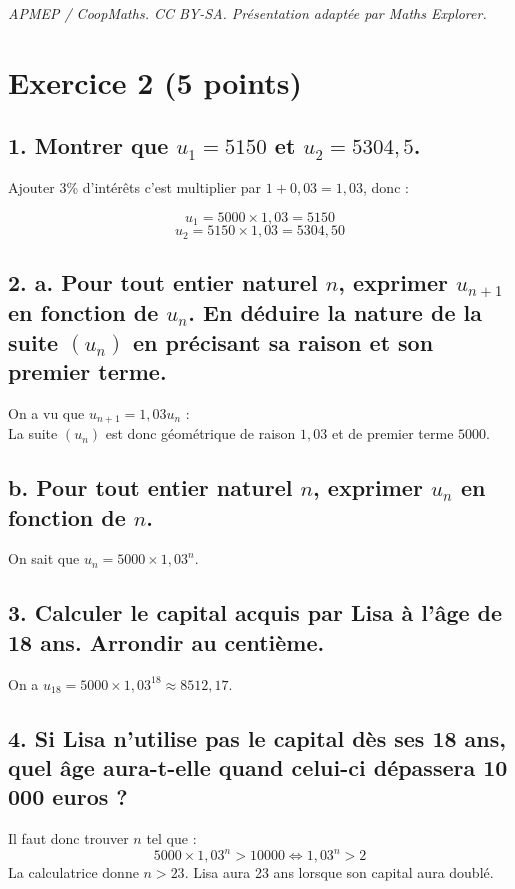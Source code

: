 \documentclass[10pt]{article}
\begin{document}
\noindent\textit{APMEP / CoopMaths. CC BY-SA. Présentation adaptée par Maths Explorer.}\par\medskip
\section*{Exercice 2 (5 points)}
	\subsection*{1. Montrer que $u_1 = 5150$ et $u_2 = 5304,5$.}
	
Ajouter 3\% d’intérêts c’est multiplier par $1 + 0,03 = 1,03$, donc :
	
	\[
	u_1 = 5000 \times 1,03 = 5150
	\]
	\[
	u_2 = 5150 \times 1,03 = 5304,50
	\]
	
	\subsection*{2. a. Pour tout entier naturel $n$, exprimer $u_{n+1}$ en fonction de $u_n$. En déduire la nature de la suite $(u_n)$ en précisant sa raison et son premier terme.}
On a vu que $u_{n+1} = 1,03u_n$ : \\
La suite $(u_n)$ est donc géométrique de raison $1,03$ et de premier terme $5 000$.
	
	\subsection*{b. Pour tout entier naturel $n$, exprimer $u_n$ en fonction de $n$.}
On sait que $u_n = 5000 \times 1,03^n$.
	
	\subsection*{3. Calculer le capital acquis par Lisa à l’âge de 18 ans. Arrondir au centième.}
On a $u_{18} = 5000 \times 1,03^{18} \approx 8512,17$.
	
	\subsection*{4. Si Lisa n’utilise pas le capital dès ses 18 ans, quel âge aura-t-elle quand celui-ci dépassera 10 000 euros ?}
Il faut donc trouver $n$ tel que :
	\[
	5000 \times 1,03^n > 10000 \iff 1,03^n > 2
	\]
La calculatrice donne $n > 23$. Lisa aura 23 ans lorsque son capital aura doublé.
\end{document}
